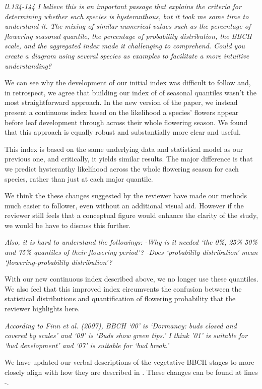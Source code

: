 \documentclass{article}[12pt]
\begin{document}
\emph{ll.134-144 I believe this is an important passage that explains the criteria for determining whether each species is hysteranthous, but it took me some time to understand it. The mixing of similar numerical values such as the percentage of flowering seasonal quantile, the percentage of probability distribution, the BBCH scale, and the aggregated index made it challenging to comprehend. Could you create a diagram using several species as examples to facilitate a more intuitive understanding?}

We can see why the development of our initial index was difficult to follow and, in retrospect, we agree that building our index of of seasonal quantiles wasn't the most straightforward approach.  In the new version of the paper, we instead present a continuous index based on the likelihood a species' flowers appear before leaf development through across their whole flowering season. We found that this approach is equally robust and substantially more clear and useful.

This index is based on the same underlying data and statistical model as our previous one, and critically, it yields similar results. The major difference is that we predict hysteranthy likelihood across the whole flowering season for each species, rather than just at each major quantile. 

We think the these changes suggested by the reviewer have made our methods much easier to follower, even without an additional visual aid. However if the reviewer still feels that a conceptual figure would enhance the clarity of the study, we would be have to discuss this further.

\emph{Also, it is hard to understand the followings:
-Why is it needed ‘the 0\%, 25\% 50\% and 75\% quantiles of their flowering period’?
-Does ‘probability distribution’ mean ‘flowering-probability distribution’?}

With our new continuous index described above, we no longer use these quantiles. We also feel that this improved index circumvents the confusion between the statistical distributions and quantification of flowering probability that the reviewer highlights here. 

\emph{According to Finn et al. (2007), BBCH ‘00’ is ‘Dormancy: buds closed and covered by scales’ and ‘09’ is ‘Buds show green tips.’ I think ’01’ is suitable for ‘bud development’ and ‘07’ is suitable for ‘bud break.’}

We have updated our verbal descriptions of the vegetative BBCH stages to more closely align with how they are described in \citet{Finn2007}. These changes can be found at lines -.
\end{document}
